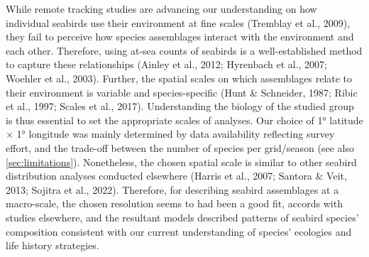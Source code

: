 \documentclass{article}
\begin{document}
While remote tracking studies are advancing our understanding on how individual seabirds use their environment at fine scales (Tremblay et al., 2009), they fail to perceive how species assemblages interact with the environment and each other. Therefore, using at-sea counts of seabirds is a well-established method to capture these relationships (Ainley et al., 2012; Hyrenbach et al., 2007; Woehler et al., 2003). Further, the spatial scales on which assemblages relate to their environment is variable and species-specific (Hunt \& Schneider, 1987; Ribic et al., 1997; Scales et al., 2017). Understanding the biology of the studied group is thus essential to set the appropriate scales of analyses. Our choice of 1° latitude \(\times\) 1° longitude was mainly determined by data availability reflecting survey effort, and the trade-off between the number of species per grid/season (see also \ref{sec:limitations}). Nonetheless, the chosen spatial scale is similar to other seabird distribution analyses conducted elsewhere (Harris et al., 2007; Santora \& Veit, 2013; Sojitra et al., 2022). Therefore, for describing seabird assemblages at a macro-scale, the chosen resolution seems to had been a good fit, accords with studies elsewhere, and the resultant models described patterns of seabird species' composition consistent with our current understanding of species' ecologies and life history strategies.
\end{document}
